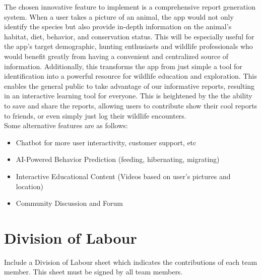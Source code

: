 \documentclass[]{article}
\begin{document}
The chosen innovative feature to implement is a comprehensive report generation system. 
When a user takes a picture of an animal, the app would not only identify the species but also provide in-depth information on the animal’s habitat, diet, behavior, and conservation status. This will be especially useful for the app's target demographic, hunting enthusiasts and wildlife professionals who would benefit greatly from having a convenient and centralized source of information. Additionally, this transforms the app from just simple a tool for identification into a powerful resource for wildlife education and exploration. This enables the general public to take advantage of our informative reports, resulting in an interactive learning tool for everyone. This is heightened by the the ability to save and share the reports, allowing users to contribute show their cool reports to friends, or even simply just log their wildlife encounters. \\

Some alternative features are as follows: 
\begin{itemize}
\item Chatbot for more user interactivity, customer support, etc
\item AI-Powered Behavior Prediction (feeding, hibernating, migrating)
\item Interactive Educational Content (Videos based on user's pictures and location)
\item Community Discussion and Forum

\end{itemize}


\appendix
\section{Division of Labour}
\label{sec:division_of_labour}
Include a Division of Labour sheet which indicates the contributions of each team member. This sheet must be signed by all team members.
\end{document}
